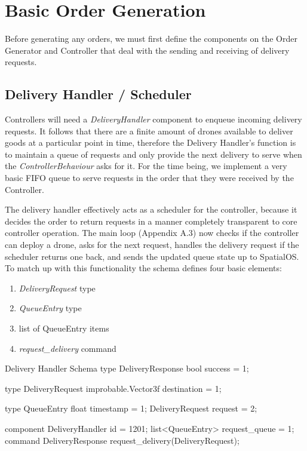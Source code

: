 \documentclass[a4paper,11pt,titlepage]{report}
\begin{document}
\section{Basic Order Generation}
Before generating any orders, we must first define the components on the Order Generator and Controller that deal with the sending and receiving of delivery requests.

\subsection{Delivery Handler / Scheduler}
Controllers will need a \textit{DeliveryHandler} component to enqueue incoming delivery requests. It follows that there are a finite amount of drones available to deliver goods at a particular point in time, therefore the Delivery Handler's function is to maintain a queue of requests and only provide the next delivery to serve when the \textit{ControllerBehaviour} asks for it. For the time being, we implement a very basic FIFO queue to serve requests in the order that they were received by the Controller.

\clearpage
The delivery handler effectively acts as a scheduler for the controller, because it decides the order to return requests in a manner completely transparent to core controller operation. The main loop (Appendix A.3) now checks if the controller can deploy a drone, asks for the next request, handles the delivery request if the scheduler returns one back, and sends the updated queue state up to SpatialOS.\\

To match up with this functionality the schema defines four basic elements:
\begin{enumerate}
  \item \textit{DeliveryRequest} type
  \item \textit{QueueEntry} type
  \item list of QueueEntry items
  \item \textit{request\_delivery} command
\end{enumerate}

\begin{sexylisting}[colback=white]{Delivery Handler Schema}
type DeliveryResponse {
  bool success = 1;
}

type DeliveryRequest {
  improbable.Vector3f destination = 1;
}

type QueueEntry {
  float timestamp = 1;
  DeliveryRequest request = 2;
}

component DeliveryHandler {
  id = 1201;
  list<QueueEntry> request_queue = 1;
  command DeliveryResponse request_delivery(DeliveryRequest);
}
\end{sexylisting}
\end{document}
